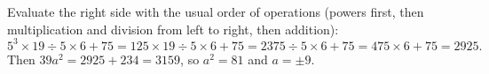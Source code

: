Evaluate the right side with the usual order of operations (powers first, then multiplication and division from left to right, then addition):
\[5^3\times19\div5\times6+75=125\times19\div5\times6+75=2375\div5\times6+75=475\times6+75=2925.\]
Then $39a^2=2925+234=3159$, so $a^2=81$ and $\boxed{a=\pm9}$.
